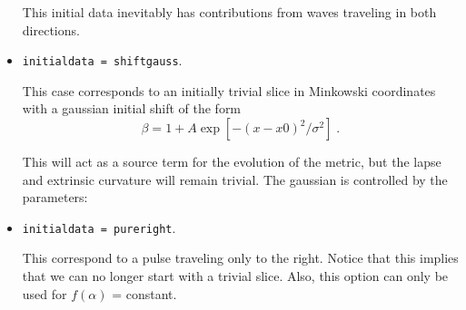 \documentclass[12pt]{article}
\begin{document}
\begin{itemize}

This initial data inevitably has contributions from waves
traveling in both directions.


\item \texttt{initialdata = shiftgauss}.

This case corresponds to an initially trivial slice in Minkowski
coordinates with a gaussian initial shift of the form
\begin{equation}
\beta = 1 + A \exp \left[ - \left( x - x0 \right)^2 / \sigma^2 \right] \; .
\end{equation}

This will act as a source term for the evolution of the metric,
but the lapse and extrinsic curvature will remain trivial.
The gaussian is controlled by the parameters:



\item \texttt{initialdata = pureright}.

This correspond to a pulse traveling only to the right. Notice that
this implies that we can no longer start with a trivial slice.  Also,
this option can only be used for $f(\alpha)$ = constant.\\


\end{itemize}
\end{document}
